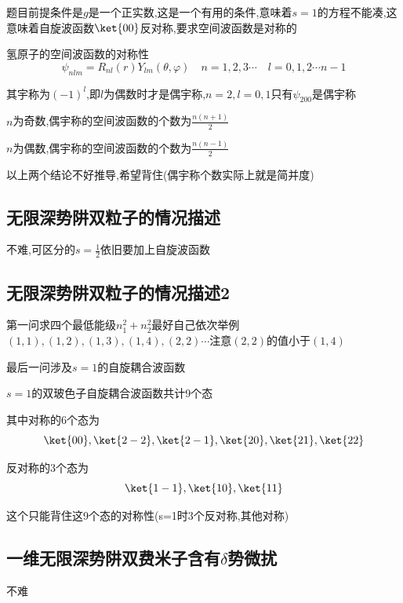             题目前提条件是$g$是一个正实数,这是一个有用的条件,意味着$s=1$的方程不能凑,这意味着自旋波函数$\ket{00}$反对称,要求空间波函数是对称的

            \begin{formal}
                氢原子的空间波函数的对称性
                $$
                \psi_{nlm} = R_{nl}(r)Y_{lm}(\theta,\varphi) \quad n=1,2,3\cdots \quad l = 0,1,2\cdots n-1
                $$

                其宇称为$(-1)^{l}$,即$l$为偶数时才是偶宇称,$n=2,l=0,1$只有$\psi_{200}$是偶宇称

                $n$为奇数,偶宇称的空间波函数的个数为$\frac{n(n+1)}{2}$

                $n$为偶数,偶宇称的空间波函数的个数为$\frac{n(n-1)}{2}$

                以上两个结论不好推导,希望背住(偶宇称个数实际上就是简并度)
            \end{formal}


        \subsection{无限深势阱双粒子的情况描述}
            不难,可区分的$s=\frac{1}{2}$依旧要加上自旋波函数

        \subsection{无限深势阱双粒子的情况描述2}
            第一问求四个最低能级$n_{1}^{2}+n_{2}^{2}$最好自己依次举例$(1,1),(1,2),(1,3),(1,4),(2,2)\cdots$注意$(2,2)$的值小于$(1,4)$

            最后一问涉及$s=1$的自旋耦合波函数

            \begin{formal}
                $s=1$的双玻色子自旋耦合波函数共计9个态

                其中对称的6个态为
                $$
                \ket{00},\ket{2-2},\ket{2-1},\ket{20},\ket{21},\ket{22}
                $$

                反对称的3个态为
                $$
                \ket{1-1},\ket{10},\ket{11}
                $$
            \end{formal}

            这个只能背住这9个态的对称性(s=1时3个反对称,其他对称)
        

        \subsection{一维无限深势阱双费米子含有\texorpdfstring{$\delta$}{}势微扰}
            不难
        

